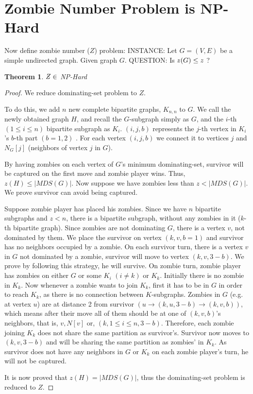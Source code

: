 \documentclass[1p]{elsarticle}
\newtheorem{theorem}{Theorem}
\newcommand{\NPZ}{\ooalign{$Z$\cr\hfil\rule[.8ex]{.3em}{.09ex}\hfil\cr}}
\newcommand{\zn}{\ooalign{$z$\cr\hfil\rule[.5ex]{.2em}{.08ex}\hfil\cr}}
\begin{document}
	
	\section{Zombie Number Problem is NP-Hard}\label{np-zombienumber}

	Now define zombie number ($Z$) problem:
	{\newline}
	INSTANCE: Let $G = (V,E)$ be a simple undirected graph. Given graph $G$.
	{\newline}
	QUESTION: Is $\zn (G) \leq z$ ?

	\begin{theorem}
		$\NPZ \in$ NP-Hard
	\end{theorem}
	\begin{proof}
		We reduce dominating-set problem to $Z$.

		To do this, we add $n$ new complete bipartite graphs, $K_{n,n}$ to $G$. We call the newly obtained graph $H$,
		and recall the $G$-subgraph simply as $G$, and the $i$-th $(1 \leq i \leq n)$ bipartite subgraph as $K_i$.
		$(i,j,b)$ represents the $j$-th vertex in $K_i$'s $b$-th part $(b = 1,2)$ . For each vertex $(i,j,b)$ we connect
		it to vertices $j$ and $N_G[j]$ (neighbors of vertex $j$ in $G$).

		By having zombies on each vertex of $G$'s minimum dominating-set, survivor will be captured on the first move and zombie
		player wins. Thus, $z(H) \leq |MDS(G)|$. Now suppose we have zombies less than $z < |MDS(G)|$. We prove survivor can
		avoid being captured.

		Suppose zombie player has placed his zombies. Since we have $n$ bipartite subgraphs and $z < n$, there is a
		bipartite subgraph, without any zombies in it ($k$-th bipartite graph). Since zombies are not dominating $G$,
		there is a vertex $v$, not dominated by them. We place the survivor on vertex $(k,v,b = 1)$ and survivor has no
		neighbors occupied by a zombie. On each survivor turn, there is a vertex $v$ in $G$ not dominated by a zombie,
		survivor will move to vertex $(k,v,3 - b)$. We prove by following this strategy, he will survive. On zombie
		turn, zombie player has zombies on either $G$ or some $K_i$ $(i \neq k)$ or $K_k$. Initially there is no zombie
		in $K_k$. Now whenever a zombie wants to join $K_k$, first it has to be in $G$ in order to reach $K_k$, as there
		is no connection between $K$-subgraphs. Zombies in $G$ (e.g. at vertex $u$) are at distance 2 from survivor $(u
		\rightarrow (k,u,3 - b) \rightarrow (k,v,b))$, which means after their move all of them should be at one of
		$(k,v,b)$'s neighbors, that is, $v , N[v] $ or, $ (k,1 \leq i \leq n,3 - b)$. Therefore, each zombie joining $K_k$ does
		not share the same partition as survivor's. Survivor now moves to $(k,v,3-b)$ and will be sharing the same
		partition as zombies' in $K_k$. As survivor does not have any neighbors in $G$ or $K_k$ on each zombie player's
		turn, he will not be captured.

		It is now proved that $z(H) = |MDS(G)|$, thus the dominating-set problem is reduced to $Z$.

	\end{proof}
\end{document}
